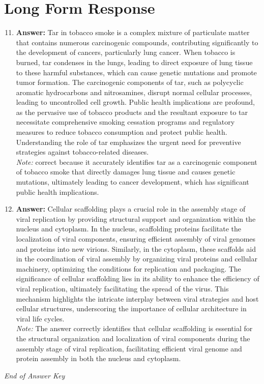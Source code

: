\documentclass[12pt]{article}
\begin{document}
\section*{Long Form Response}
\begin{enumerate}[label=\arabic*.]
\setcounter{enumi}{10}
\item \textbf{Answer:} Tar in tobacco smoke is a complex mixture of particulate matter that contains numerous carcinogenic compounds, contributing significantly to the development of cancers, particularly lung cancer. When tobacco is burned, tar condenses in the lungs, leading to direct exposure of lung tissue to these harmful substances, which can cause genetic mutations and promote tumor formation. The carcinogenic components of tar, such as polycyclic aromatic hydrocarbons and nitrosamines, disrupt normal cellular processes, leading to uncontrolled cell growth. Public health implications are profound, as the pervasive use of tobacco products and the resultant exposure to tar necessitate comprehensive smoking cessation programs and regulatory measures to reduce tobacco consumption and protect public health. Understanding the role of tar emphasizes the urgent need for preventive strategies against tobacco-related diseases.
\\ \textit{Note:} correct because it accurately identifies tar as a carcinogenic component of tobacco smoke that directly damages lung tissue and causes genetic mutations, ultimately leading to cancer development, which has significant public health implications.
\item \textbf{Answer:} Cellular scaffolding plays a crucial role in the assembly stage of viral replication by providing structural support and organization within the nucleus and cytoplasm. In the nucleus, scaffolding proteins facilitate the localization of viral components, ensuring efficient assembly of viral genomes and proteins into new virions. Similarly, in the cytoplasm, these scaffolds aid in the coordination of viral assembly by organizing viral proteins and cellular machinery, optimizing the conditions for replication and packaging. The significance of cellular scaffolding lies in its ability to enhance the efficiency of viral replication, ultimately facilitating the spread of the virus. This mechanism highlights the intricate interplay between viral strategies and host cellular structures, underscoring the importance of cellular architecture in viral life cycles.
\\ \textit{Note:} The answer correctly identifies that cellular scaffolding is essential for the structural organization and localization of viral components during the assembly stage of viral replication, facilitating efficient viral genome and protein assembly in both the nucleus and cytoplasm.
\end{enumerate}

\vfill
\noindent\textit{End of Answer Key}
\end{document}
